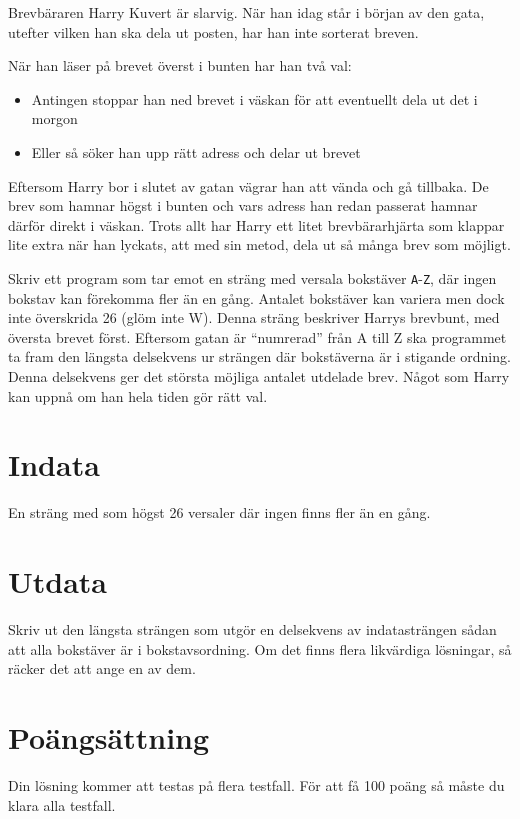 
Brevbäraren Harry Kuvert är slarvig. När han idag står i början av den gata, utefter vilken han
ska dela ut posten, har han inte sorterat breven.

När han läser på brevet överst i bunten har han två val:
\begin{itemize}
    \item Antingen stoppar han ned brevet i väskan för att eventuellt dela ut det i morgon
    \item Eller så söker han upp rätt adress och delar ut brevet
\end{itemize}

Eftersom Harry bor i slutet av gatan vägrar han att vända och gå tillbaka. De brev som hamnar
högst i bunten och vars adress han redan passerat hamnar därför direkt i väskan.
Trots allt har Harry ett litet brevbärarhjärta som klappar lite extra när han lyckats, att med sin
metod, dela ut så många brev som möjligt.

Skriv ett program som tar emot en sträng med versala bokstäver \texttt{A}-\texttt{Z}, där ingen bokstav
kan förekomma fler än en gång. Antalet bokstäver kan variera men dock inte överskrida 26
(glöm inte W). Denna sträng beskriver Harrys brevbunt, med översta brevet först. Eftersom
gatan är ``numrerad'' från A till Z ska programmet ta fram den längsta delsekvens ur strängen
där bokstäverna är i stigande ordning. Denna delsekvens ger det största möjliga antalet
utdelade brev. Något som Harry kan uppnå om han hela tiden gör rätt val.

\section*{Indata}
En sträng med som högst 26 versaler där ingen finns fler än en gång.


\section*{Utdata}
Skriv ut den längsta strängen som utgör en delsekvens av indatasträngen sådan att alla bokstäver
är i bokstavsordning. Om det finns flera likvärdiga lösningar, så räcker det att ange en av dem.

\section*{Poängsättning}
Din lösning kommer att testas på flera testfall. För att få 100 poäng så måste du klara alla testfall.

